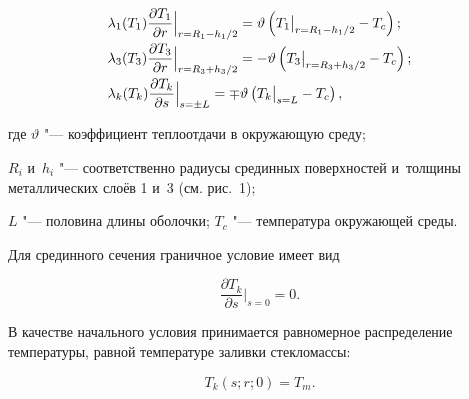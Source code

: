 \begin{equation}

\label{pikul:eq3}

\begin{array}{l}

\displaystyle \lambda _1 (T_1)\frac{\partial T_1 }{\partial r} \Big|_{r=R_1 -{h_1 }/{2}} =\vartheta \left( T_1\big|_{r=R_1 -{h_1 }/{2}} -T_c  \right); \vspace{1mm} \\

\displaystyle \lambda _3 (T_3)\frac{\partial T_3 }{\partial r} \Big|_{r=R_3 +{h_3}/{2}} =-\vartheta \left( T_3\big|_{r=R_3 +{h_3}/{2}} -T_c  \right);

\vspace{1mm} \\

\displaystyle \lambda _k (T_k)\frac{\partial T_k }{\partial s} \Big|_{s=\pm L} =\mp \vartheta \left( T_k \big|_{s=L} -T_c \right),

\end{array}

\end{equation}

где $\vartheta $ "--- коэффициент теплоотдачи в окружающую среду; 

$R_{i}$ и~$h_{i}$ "--- соответственно радиусы срединных поверхностей и~толщины металлических слоёв 1 и~3 (см. рис.~1); 

$L$ "--- половина длины оболочки; $T_{c}$ "--- температура окружающей среды.



Для срединного сечения граничное условие имеет вид

\begin{equation}

\label{pikul:eq4}

\frac{\partial T_k }{\partial s} \Big|_{s=0} =0.

\end{equation}



В качестве начального условия принимается равномерное распределение температуры, равной температуре заливки стекломассы:

\begin{equation}

\label{pikul:eq5-1}

T_{k}(s; r; 0)=T_{m}.

\end{equation}



